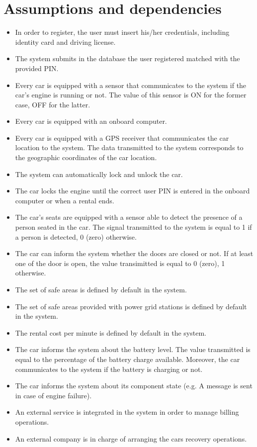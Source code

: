 \section{Assumptions and dependencies}

\begin{itemize}
	\item In order to register, the user must insert his/her credentials, including identity card and driving license.
	\item The system submits in the database the user registered matched with the provided PIN.
	\item Every car is equipped with a sensor that communicates to the system if the car's engine is running or not. The value of this sensor is ON for the former case, OFF for the latter.
	\item Every car is equipped with an onboard computer.
	\item Every car is equipped with a GPS receiver that communicates the car location to the system. The data transmitted to the system corresponds to the geographic coordinates of the car location.
	\item The system can automatically lock and unlock the car.
	\item The car locks the engine until the correct user PIN is entered in the onboard computer or when a rental ends.
	\item The car's seats are equipped with a sensor able to detect the presence of a person seated in the car. The signal transmitted to the system is equal to 1 if a person is detected, 0 (zero) otherwise.
	\item The car can inform the system whether the doors are closed or not. If at least one of the door is open, the value transimitted is equal to 0 (zero), 1 otherwise.
	\item The set of safe areas is defined by default in the system.
	\item The set of safe areas provided with power grid stations is defined by default in the system.
	\item The rental cost per minute is defined by default in the system.
	\item The car informs the system about the battery level. The value transmitted is equal to the percentage of the battery charge available. Moreover, the car communicates to the system if the battery is charging or not.
	\item The car informs the system about its component state (e.g. A message is sent in case of engine failure).
	\item An external service is integrated in the system in order to manage billing operations.
	\item An external company is in charge of arranging the cars recovery operations.
\end{itemize}
